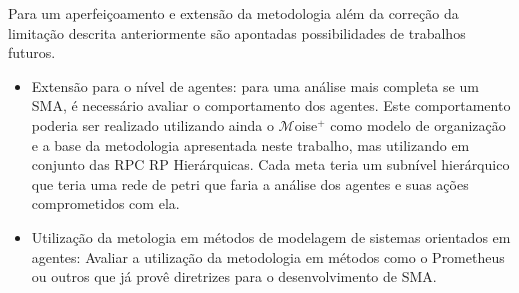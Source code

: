 Para um aperfeiçoamento e extensão da metodologia além da correção da limitação descrita anteriormente são apontadas  possibilidades de trabalhos futuros.

\begin{itemize}
\item Extensão para o nível de agentes: para uma análise mais completa se um SMA, é necessário avaliar o comportamento dos agentes. Este comportamento poderia ser realizado utilizando ainda o $\mathcal{M}$oise$^{+}$ como modelo de organização e a base da metodologia apresentada neste trabalho, mas utilizando em conjunto das RPC RP Hierárquicas. Cada meta teria um subnível hierárquico que teria uma rede de petri que faria a análise dos agentes e suas ações comprometidos com ela.

\item Utilização da metologia em métodos de modelagem de sistemas orientados em agentes: Avaliar a utilização da metodologia em métodos como o Prometheus ou outros que já provê diretrizes para o desenvolvimento de SMA.
\end{itemize}

